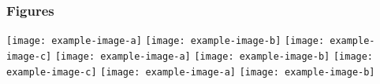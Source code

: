 \begin{frame}
    \frametitle{Figures}
    \texttt{[image: example-image-a]}
    \texttt{[image: example-image-b]}
    \texttt{[image: example-image-c]}
    \texttt{[image: example-image-a]}
    \texttt{[image: example-image-b]}
    \texttt{[image: example-image-c]}
    \texttt{[image: example-image-a]}
    \texttt{[image: example-image-b]}
\end{frame}